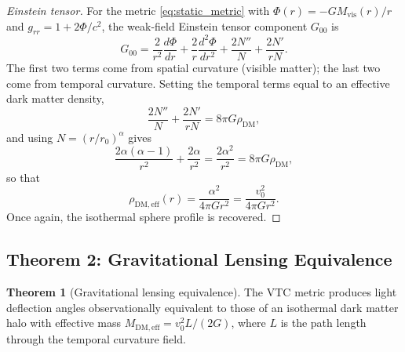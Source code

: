 \documentclass[11pt,a4paper]{article}
\theoremstyle{definition}
\newtheorem{theorem}{Theorem}[section]
\newcommand{\vis}{\mathrm{vis}}
\newcommand{\eff}{\mathrm{eff}}
\newcommand{\DM}{\mathrm{DM}}
\begin{document}
\begin{proof}[Einstein tensor]
For the metric \eqref{eq:static_metric} with $\Phi(r)=-GM_{\vis}(r)/r$ and $g_{rr}=1+2\Phi/c^2$, the weak-field Einstein tensor component $G_{00}$ is
\begin{equation}
    G_{00} = \frac{2}{r^2}\frac{d\Phi}{dr} + \frac{2}{r}\frac{d^2\Phi}{dr^2} + \frac{2N''}{N} + \frac{2N'}{rN}.
\end{equation}
The first two terms come from spatial curvature (visible matter); the last two come from temporal curvature. Setting the temporal terms equal to an effective dark matter density,
\begin{equation}
    \frac{2N''}{N} + \frac{2N'}{rN} = 8\pi G\rho_{\DM},
\end{equation}
and using $N=(r/r_0)^\alpha$ gives
\begin{equation}
    \frac{2\alpha(\alpha-1)}{r^2} + \frac{2\alpha}{r^2} = \frac{2\alpha^2}{r^2} = 8\pi G\rho_{\DM},
\end{equation}
so that
\begin{equation}
    \boxed{\rho_{\DM,\eff}(r) = \frac{\alpha^2}{4\pi G r^2} = \frac{v_0^2}{4\pi G r^2}}.
\end{equation}
Once again, the isothermal sphere profile is recovered.
\end{proof}

\subsection{Theorem 2: Gravitational Lensing Equivalence}

\begin{theorem}[Gravitational lensing equivalence]
\label{thm:lensing}
The VTC metric produces light deflection angles observationally equivalent to those of an isothermal dark matter halo with effective mass $M_{\DM,\eff}=v_0^2 L/(2G)$, where $L$ is the path length through the temporal curvature field.
\end{theorem}
\end{document}
